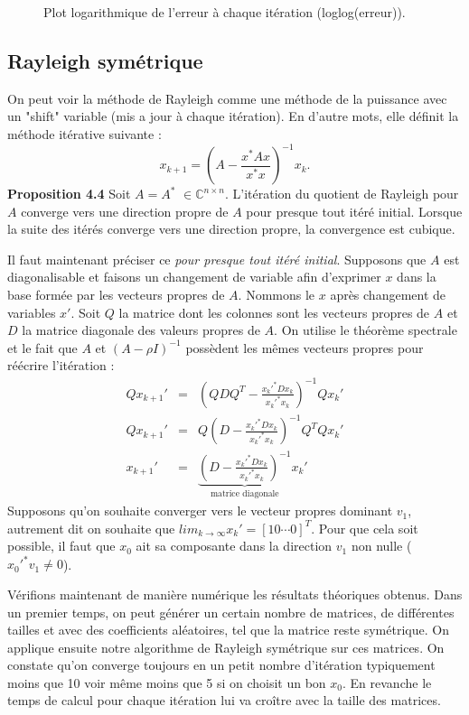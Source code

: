 \begin{figure}
\begin{tabular}{cc}
\end{tabular}
\caption{Plot logarithmique de l'erreur à chaque itération (loglog(erreur)). }
\label{plor_erreur}
\end{figure}

\subsection*{Rayleigh symétrique}
On peut voir la méthode de Rayleigh comme une méthode de la puissance avec un "shift" variable (mis a jour à chaque itération). En d'autre mots, elle définit la méthode itérative suivante : 
$$x_{k+1} = \left(  A- \frac{x^*Ax}{x^*x}  \right)^{-1} x_k.  $$
\textbf{Proposition 4.4} Soit $A = A^*$ $ \in \mathbb{C}^{n\times n}$. L'itération du quotient de Rayleigh pour $A$ converge vers une direction propre de $A$ pour presque tout itéré initial. Lorsque la suite des itérés converge vers une direction propre, la convergence est cubique. 

Il faut maintenant préciser ce \textit{pour presque tout itéré initial}. Supposons que $A$ est diagonalisable et faisons un changement de variable afin d'exprimer $x$ dans la base formée par les vecteurs propres de $A$. Nommons le $x$ après changement de variables $x'$. Soit $Q$ la matrice dont les colonnes sont les vecteurs propres de $A$ et $D$ la matrice diagonale des valeurs propres de $A$. On utilise le théorème spectrale et le fait que $A$ et $(A-\rho I)^{-1}$ possèdent les mêmes vecteurs propres pour réécrire l'itération : 
\begin{eqnarray}
Qx_{k+1}' & = &(Q D Q^T - \frac{x_k'^* D x_k}{x_k'^* x_k})^{-1} Qx_{k}'\\
Qx_{k+1}' & = & Q(D-\frac{x_k'^* D x_k}{x_k'^* x_k})^{-1}Q^T Qx_k'\\
x_{k+1}' & = & \underbrace{(D-\frac{x_k'^* D x_k}{x_k'^* x_k})^{-1}}_{\text{matrice diagonale}} x_k'
\end{eqnarray}
Supposons qu'on souhaite converger vers le vecteur propres dominant $v_1$, autrement dit on souhaite que $lim_{k\rightarrow \infty} x_k' = [1 0 \cdots 0]^T$. Pour que cela soit possible, il faut que $x_0$ ait sa composante dans la direction $v_1$ non nulle ($x_0'^* v_1 \neq 0$). 

Vérifions maintenant de manière numérique les résultats théoriques obtenus. Dans un premier temps, on peut générer un certain nombre de matrices, de différentes tailles et avec des coefficients aléatoires, tel que la matrice reste symétrique. On applique ensuite notre algorithme de Rayleigh symétrique sur ces matrices. On constate qu'on converge toujours en un petit nombre d'itération typiquement moins que 10 voir même moins que 5 si on choisit un bon $x_0$. En revanche le temps de calcul pour chaque itération lui va croître avec la taille des matrices.

